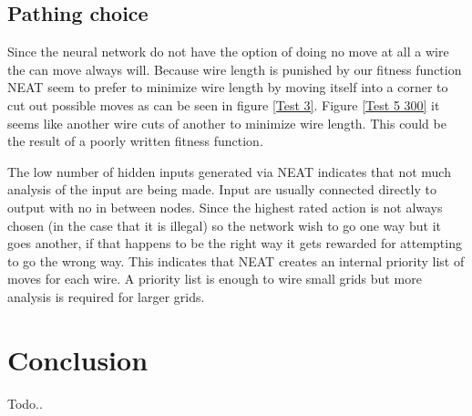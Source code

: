\documentclass{kththesis}
\begin{document}
\section{Pathing choice}
Since the neural network do not have the option of doing no move at all a wire the can move always will. Because wire length is punished by our fitness function NEAT seem to prefer to minimize wire length by moving itself into a corner to cut out possible moves as can be seen in figure \ref{Test 3}. Figure \ref{Test 5 300} it seems like another wire cuts of another to minimize wire length. This could be the result of a poorly written fitness function.

The low number of hidden inputs generated via NEAT indicates that not much analysis of the input are being made. Input are usually connected directly to output with no in between nodes. Since the highest rated action is not always chosen (in the case that it is illegal) so the network wish to go one way but it goes another, if that happens to be the right way it gets rewarded for attempting to go the wrong way. This indicates that NEAT creates an internal priority list of moves for each wire. A priority list is enough to wire small grids but more analysis is required for larger grids.

\chapter{Conclusion}

Todo..

\printbibliography[heading=bibintoc] %
\end{document}
